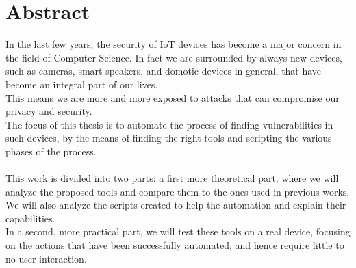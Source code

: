\chapter*{Abstract} %
\label{abtract}


In the last few years, the security of IoT devices has become a major concern
in the field of Computer Science. In fact we are surrounded by always
new devices, such as cameras, smart speakers, and domotic devices in general,
that have become an integral part of our lives. \\
This means we are more and more exposed to attacks that can compromise our
privacy and security. \\
The focus of this thesis is to automate the process of finding vulnerabilities
in such devices, by the means of finding the right tools and scripting the
various phases of the process. \\\\
This work is divided into two parts: a first more theoretical part, where
we will analyze the proposed tools and compare them to the ones used in previous works.
We will also analyze the scripts created to help the automation and explain their capabilities. \\
In a second, more practical part, we will test these tools on a real device,
focusing on the actions that have been successfully automated, and hence require
little to no user interaction. \\
\newpage
